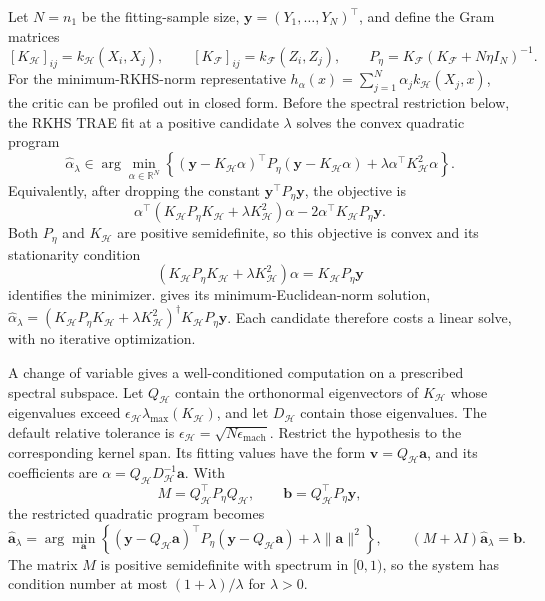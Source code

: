 Let $N=n_1$ be the fitting-sample size, $\boldsymbol y=(Y_1,\ldots,Y_N)^\top$, and define the Gram matrices
\[
[K_{\mathcal H}]_{ij}=k_{\mathcal H}(X_i,X_j),
\qquad
[K_{\mathcal F}]_{ij}=k_{\mathcal F}(Z_i,Z_j),
\qquad
P_\eta=K_{\mathcal F}(K_{\mathcal F}+N\eta I_N)^{-1}.
\]
For the minimum-RKHS-norm representative $h_\alpha(x)=\sum_{j=1}^N\alpha_j k_{\mathcal H}(X_j,x)$, the critic can be profiled out in closed form. Before the spectral restriction below, the RKHS TRAE fit at a positive candidate $\lambda$ solves the convex quadratic program
\begin{equation}
\label{eq:rkhs_qp}
\widehat\alpha_\lambda
\in\arg\min_{\alpha\in\mathbb R^N}
\left\{
(\boldsymbol y-K_{\mathcal H}\alpha)^\top P_\eta
(\boldsymbol y-K_{\mathcal H}\alpha)
+\lambda\alpha^\top K_{\mathcal H}^2\alpha
\right\}.
\end{equation}
Equivalently, after dropping the constant $\boldsymbol y^\top P_\eta\boldsymbol y$, the objective is
\[
\alpha^\top(K_{\mathcal H}P_\eta K_{\mathcal H}
+\lambda K_{\mathcal H}^2)\alpha
-2\alpha^\top K_{\mathcal H}P_\eta\boldsymbol y.
\]
Both $P_\eta$ and $K_{\mathcal H}$ are positive semidefinite, so this objective is convex and its stationarity condition
\begin{equation}\label{eq:rkhs_normal}
\left(K_{\mathcal H}P_\eta K_{\mathcal H}+\lambda K_{\mathcal H}^{2}\right)\alpha
=K_{\mathcal H}P_\eta\boldsymbol y
\end{equation}
identifies the minimizer.  gives its minimum-Euclidean-norm solution, $\widehat\alpha_\lambda=(K_{\mathcal H}P_\eta K_{\mathcal H}+\lambda K_{\mathcal H}^{2})^{\dagger}K_{\mathcal H}P_\eta\boldsymbol y$. Each candidate therefore costs a linear solve, with no iterative optimization.

A change of variable gives a well-conditioned computation on a prescribed spectral subspace. Let $Q_{\mathcal H}$ contain the orthonormal eigenvectors of $K_{\mathcal H}$ whose eigenvalues exceed $\epsilon_{\mathcal H}\lambda_{\max}(K_{\mathcal H})$, and let $D_{\mathcal H}$ contain those eigenvalues. The default relative tolerance is $\epsilon_{\mathcal H}=\sqrt{N\epsilon_{\mathrm{mach}}}$. Restrict the hypothesis to the corresponding kernel span. Its fitting values have the form $\boldsymbol v=Q_{\mathcal H}\boldsymbol a$, and its coefficients are $\alpha=Q_{\mathcal H}D_{\mathcal H}^{-1}\boldsymbol a$. With
\[
M=Q_{\mathcal H}^\top P_\eta Q_{\mathcal H},
\qquad
\boldsymbol b=Q_{\mathcal H}^\top P_\eta\boldsymbol y,
\]
the restricted quadratic program becomes
\begin{equation}\label{eq:rkhs_value_program}
\widehat{\boldsymbol a}_\lambda
=\arg\min_{\boldsymbol a}
\left\{(\boldsymbol y-Q_{\mathcal H}\boldsymbol a)^\top P_\eta
(\boldsymbol y-Q_{\mathcal H}\boldsymbol a)+\lambda\|\boldsymbol a\|^2\right\},
\qquad
(M+\lambda I)\widehat{\boldsymbol a}_\lambda=\boldsymbol b.
\end{equation}
The matrix $M$ is positive semidefinite with spectrum in $[0,1)$, so the system has condition number at most $(1+\lambda)/\lambda$ for $\lambda>0$.

